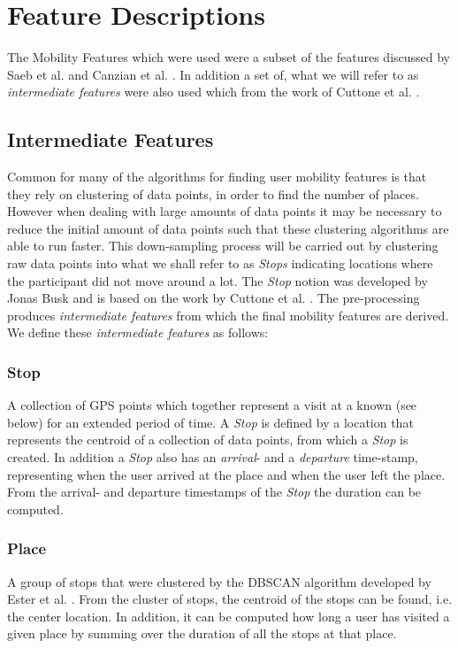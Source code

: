 \section{Feature Descriptions}
The Mobility Features which were used were a subset of the features discussed by Saeb et al. \cite{Saeb2015} and Canzian et al. \cite{Canzian2015}. In addition a set of, what we will refer to as \textit{intermediate features} were also used which from the work of Cuttone et al. \cite{sparse-location-2014}. 

\subsection{Intermediate Features}
Common for many of the algorithms for finding user mobility features is that they rely on clustering of data points, in order to find the number of places. However when dealing with large amounts of data points it may be necessary to reduce the initial amount of data points such that these clustering algorithms are able to run faster. This down-sampling process will be carried out by clustering raw data points into what we shall refer to as \textit{Stops} indicating locations where the participant did not move around a lot. The \textit{Stop} notion was developed by Jonas Busk and is based on the work by Cuttone et al. \cite{sparse-location-2014}. The pre-processing produces \textit{intermediate features} from which the final mobility features are derived. We define these \textit{intermediate features} as follows:

\subsubsection*{Stop}
A collection of GPS points which together represent a visit at a known  (see below) for an extended period of time. A \textit{Stop} is defined by a location that represents the centroid of a collection of data points, from which a \textit{Stop} is created. In addition a \textit{Stop} also has an \textit{arrival}- and a \textit{departure} time-stamp, representing when the user arrived at the place and when the user left the place. From the arrival- and departure timestamps of the \textit{Stop} the duration can be computed.

\subsubsection*{Place}
A group of stops that were clustered by the DBSCAN algorithm developed by Ester et al. \cite{density-based-1996}. From the cluster of stops, the centroid of the stops can be found, i.e. the center location. In addition, it can be computed how long a user has visited a given place by summing over the duration of all the stops at that place.

